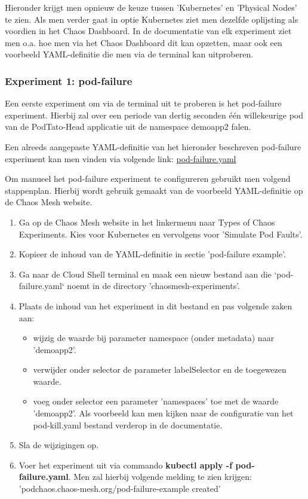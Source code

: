 Hieronder krijgt men opnieuw de keuze tussen 'Kubernetes' en 'Physical Nodes' te zien. Als men verder gaat in optie Kubernetes ziet men dezelfde oplijsting als voordien in het Chaos Dashboard. In de documentatie van elk experiment ziet men o.a. hoe men via het Chaos Dashboard dit kan opzetten, maar ook een voorbeeld YAML-definitie die men via de terminal kan uitproberen.

\subsubsection{Experiment 1: pod-failure}

Een eerste experiment om via de terminal uit te proberen is het pod-failure experiment. Hierbij zal over een periode van dertig seconden één willekeurige pod van de PodTato-Head applicatie uit de namespace demoapp2 falen. 

Een alreeds aangepaste YAML-definitie van het hieronder beschreven pod-failure experiment kan men vinden via volgende link: \href{https://github.com/KenBruggeman/BP_21-22/blob/master/bachelorproef/docs/chaosmesh-experimenten/pod-failure.yaml}{pod-failure.yaml} 

Om manueel het pod-failure experiment te configureren gebruikt men volgend stappenplan. Hierbij wordt gebruik gemaakt van de voorbeeld YAML-definitie op de Chaos Mesh website.
\begin{enumerate}
    \item Ga op de Chaos Mesh website in het linkermenu naar Types of Chaos Experiments. Kies voor Kubernetes en vervolgens voor 'Simulate Pod Faults'.
    \item Kopieer de inhoud van de YAML-definitie in sectie 'pod-failure example'.
    \item Ga naar de Cloud Shell terminal en maak een nieuw bestand aan die `pod-failure.yaml` noemt in de directory 'chaosmesh-experiments'.
    \item Plaats de inhoud van het experiment in dit bestand en pas volgende zaken aan:
    \begin{itemize}
        \item wijzig de waarde bij parameter namespace (onder metadata) naar 'demoapp2'. 
        \item verwijder onder selector de parameter labelSelector en de toegewezen waarde.
        \item voeg onder selector een parameter 'namespaces' toe met de waarde 'demoapp2'. Als voorbeeld kan men kijken naar de configuratie van het pod-kill.yaml bestand verderop in de documentatie.
        \end{itemize} 
    \item Sla de wijzigingen op.
    \item Voer het experiment uit via commando {\bf kubectl apply -f pod-failure.yaml}. Men zal hierbij volgende melding te zien krijgen: 'podchaos.chaos-mesh.org/pod-failure-example created' 
\end{enumerate}

